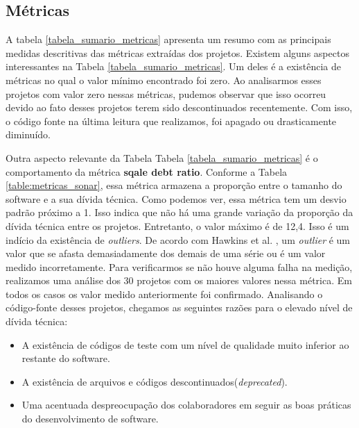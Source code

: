 \subsection{Métricas}

A tabela \ref{tabela_sumario_metricas} apresenta um resumo com as principais medidas descritivas das métricas extraídas dos projetos. Existem alguns aspectos interessantes na Tabela \ref{tabela_sumario_metricas}. Um deles é a existência de métricas no qual o valor mínimo encontrado foi zero. Ao analisarmos esses projetos com valor zero nessas métricas, pudemos observar que isso ocorreu devido ao fato desses projetos terem sido descontinuados recentemente. Com isso, o código fonte na última leitura que realizamos, foi apagado ou drasticamente diminuído.  

Outra aspecto relevante da Tabela Tabela \ref{tabela_sumario_metricas} é o comportamento da métrica \textbf{sqale debt ratio}. Conforme a Tabela \ref{table:metricas_sonar}, essa métrica armazena a proporção entre o tamanho do software e a sua dívida técnica. Como podemos ver, essa métrica tem um desvio padrão próximo a 1. Isso indica que não há uma grande variação da proporção da dívida técnica entre os projetos.  Entretanto, o valor máximo é de 12,4. Isso é um indício da existência de \textit{outliers}. De acordo com Hawkins et al. \cite{hawkins1980identification}, um \textit{outlier} é um valor que se afasta demasiadamente dos demais de uma série ou é um valor medido incorretamente. Para verificarmos se não houve alguma falha na medição, realizamos uma análise dos 30 projetos com os maiores valores nessa métrica. Em todos os casos os valor medido anteriormente foi confirmado. Analisando o código-fonte desses projetos, chegamos as seguintes razões para o elevado nível de dívida técnica:

\begin{itemize}
\item A existência de códigos de teste com um nível de qualidade muito inferior ao restante do software.
\item A existência de arquivos e códigos descontinuados(\textit{deprecated}).
\item  Uma acentuada despreocupação dos colaboradores em seguir as boas práticas do desenvolvimento de software.
\end{itemize}


